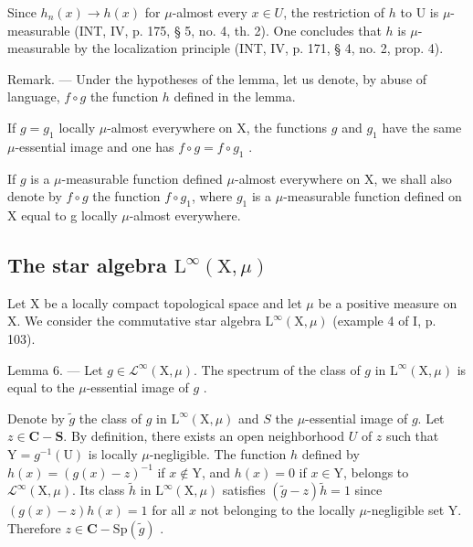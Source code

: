 Since \(h_{n}(x) \to h(x)\) for \(\mu\)-almost every \(x \in U\), the restriction of \(h\) to U is \(\mu\)-measurable (INT, IV, p. 175, § 5, no. 4, th. 2). One concludes that \(h\) is \(\mu\)-measurable by the localization principle (INT, IV, p. 171, § 4, no. 2, prop. 4).

Remark. --- Under the hypotheses of the lemma, let us denote, by abuse of language, \(f \circ g\) the function \(h\) defined in the lemma.

If \(g = g_{1}\) locally \(\mu\)-almost everywhere on X, the functions \(g\) and \(g_{1}\) have the same \(\mu\)-essential image and one has \(f \circ g = f \circ g_{1}\) .

If \(g\) is a \(\mu\)-measurable function defined \(\mu\)-almost everywhere on X, we shall also denote by \(f \circ g\) the function \(f \circ g_{1}\), where \(g_{1}\) is a \(\mu\)-measurable function defined on X equal to g locally \(\mu\)-almost everywhere.

\subsection{\texorpdfstring{The star algebra \(\mathrm{L}^{\infty}(\mathrm{X},\mu)\)}{The star algebra \textbackslash mathrm\{L\}\^{}\{\textbackslash infty\}(\textbackslash mathrm\{X\},\textbackslash mu)}}

Let X be a locally compact topological space and let \(\mu\) be a positive measure on X. We consider the commutative star algebra \(\mathrm{L}^{\infty}(\mathrm{X},\mu)\) (example 4 of I, p. 103).

Lemma 6. --- Let \(g \in \mathcal{L}^{\infty}(\mathrm{X}, \mu)\). The spectrum of the class of \(g\) in \(\mathrm{L}^{\infty}(\mathrm{X}, \mu)\) is equal to the \(\mu\)-essential image of \(g\) .

Denote by \(\widetilde{g}\) the class of \(g\) in \(\mathrm{L}^{\infty}(\mathrm{X},\mu)\) and \(S\) the \(\mu\)-essential image of \(g\). Let \(z\in \mathbf{C} - \mathbf{S}\). By definition, there exists an open neighborhood \(U\) of \(z\) such that \(\mathrm{Y} = g^{-1}(\mathrm{U})\) is locally \(\mu\)-negligible. The function \(h\) defined by \(h(x) = (g(x) - z)^{-1}\) if \(x\notin \mathrm{Y}\), and \(h(x) = 0\) if \(x\in \mathrm{Y}\), belongs to \(\mathcal{L}^{\infty}(\mathrm{X},\mu)\). Its class \(\widetilde{h}\) in \(\mathrm{L}^{\infty}(\mathrm{X},\mu)\) satisfies \((\widetilde{g} -z)\widetilde{h} = 1\) since \((g(x) - z)h(x) = 1\) for all \(x\) not belonging to the locally \(\mu\)-negligible set Y. Therefore \(z\in \mathbf{C} - \mathrm{Sp}(\widetilde{g})\) .

